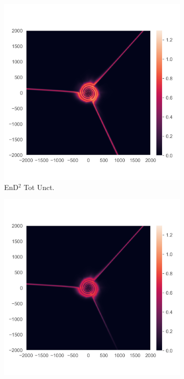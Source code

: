 \begin{figure}
\begin{subfigure}{0.22\textwidth}
  \centering
  \includegraphics[trim=42 45 15 55, clip, width=\linewidth]{../openreview/plots/3d.png}
  \caption{EnD$^2$ Tot Unct.}
  \label{fig:3d}
\end{subfigure}%
\begin{subfigure}{0.22\textwidth}
  \centering
  \includegraphics[trim=42 45 15 55, clip, width=\linewidth]{../openreview/plots/3e.png}

\end{subfigure}
\end{figure}
